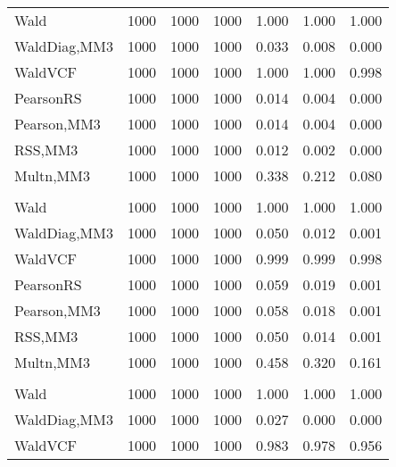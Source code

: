 \documentclass[
]{article}
\begin{document}
\begin{table}[H]
{\begin{tabular}[t]{lrrrrrr}
\hspace{1em}Wald & 1000 & 1000 & 1000 & 1.000 & 1.000 & \vphantom{2} 1.000\\
\hspace{1em}WaldDiag,MM3 & 1000 & 1000 & 1000 & 0.033 & 0.008 & 0.000\\
\hspace{1em}WaldVCF & 1000 & 1000 & 1000 & 1.000 & 1.000 & 0.998\\
\hspace{1em}PearsonRS & 1000 & 1000 & 1000 & 0.014 & 0.004 & 0.000\\
\hspace{1em}Pearson,MM3 & 1000 & 1000 & 1000 & 0.014 & 0.004 & 0.000\\
\hspace{1em}RSS,MM3 & 1000 & 1000 & 1000 & 0.012 & 0.002 & 0.000\\
\hspace{1em}Multn,MM3 & 1000 & 1000 & 1000 & 0.338 & 0.212 & 0.080\\
\addlinespace[0.3em]
\multicolumn{7}{l}{\textbf{2F 10V}}\\
\hspace{1em}Wald & 1000 & 1000 & 1000 & 1.000 & 1.000 & \vphantom{1} 1.000\\
\hspace{1em}WaldDiag,MM3 & 1000 & 1000 & 1000 & 0.050 & 0.012 & 0.001\\
\hspace{1em}WaldVCF & 1000 & 1000 & 1000 & 0.999 & 0.999 & 0.998\\
\hspace{1em}PearsonRS & 1000 & 1000 & 1000 & 0.059 & 0.019 & 0.001\\
\hspace{1em}Pearson,MM3 & 1000 & 1000 & 1000 & 0.058 & 0.018 & 0.001\\
\hspace{1em}RSS,MM3 & 1000 & 1000 & 1000 & 0.050 & 0.014 & 0.001\\
\hspace{1em}Multn,MM3 & 1000 & 1000 & 1000 & 0.458 & 0.320 & 0.161\\
\addlinespace[0.3em]
\multicolumn{7}{l}{\textbf{3F 15V}}\\
\hspace{1em}Wald & 1000 & 1000 & 1000 & 1.000 & 1.000 & 1.000\\
\hspace{1em}WaldDiag,MM3 & 1000 & 1000 & 1000 & 0.027 & 0.000 & 0.000\\
\hspace{1em}WaldVCF & 1000 & 1000 & 1000 & 0.983 & 0.978 & 0.956\\

\end{tabular}}
\end{table}
\end{document}
